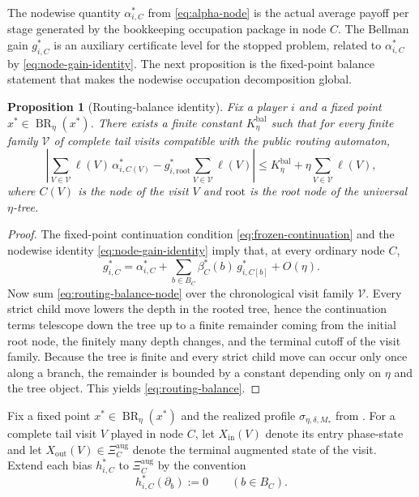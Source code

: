 \documentclass[12pt]{article}
\newtheorem{proposition}[theorem]{Proposition}
\theoremstyle{definition}
\newcommand{\1}{\mathbf{1}}
\DeclareMathOperator{\BR}{BR}
\begin{document}
The nodewise quantity $\alpha_{i,C}^*$ from \eqref{eq:alpha-node} is the actual
average payoff per stage generated by the bookkeeping occupation package in node
$C$. The Bellman gain $g_{i,C}^*$ is an auxiliary certificate level for the
stopped problem, related to $\alpha_{i,C}^*$ by
\eqref{eq:node-gain-identity}. The next proposition is the fixed-point balance
statement that makes the nodewise occupation decomposition global.

\begin{proposition}[Routing-balance identity]
\label{prop:routing-balance}
Fix a player $i$ and a fixed point $x^*\in\BR_\eta(x^*)$. There exists a finite
constant $K_\eta^{\mathrm{bal}}$ such that for every finite family
$\mathcal V$ of complete tail visits compatible with the public routing
automaton,
\begin{equation}
\label{eq:routing-balance}
\left|
\sum_{V\in\mathcal V}\ell(V)\,\alpha_{i,C(V)}^*
-
g_{i,\mathrm{root}}^*\sum_{V\in\mathcal V}\ell(V)
\right|
\le
K_\eta^{\mathrm{bal}} + \eta\sum_{V\in\mathcal V}\ell(V),
\end{equation}
where $C(V)$ is the node of the visit $V$ and $\mathrm{root}$ is the root node
of the universal $\eta$-tree.
\end{proposition}

\begin{proof}
The fixed-point continuation condition
\eqref{eq:frozen-continuation} and the nodewise identity
\eqref{eq:node-gain-identity} imply that, at every ordinary node $C$,
\begin{equation}
\label{eq:routing-balance-node}
g_{i,C}^*
=
\alpha_{i,C}^*
+
\sum_{b\in B_C}\beta_C^*(b)\,g_{i,C[b]}^*
+
O(\eta).
\end{equation}
Now sum \eqref{eq:routing-balance-node} over the chronological visit family
$\mathcal V$. Every strict child move lowers the depth in the rooted tree, hence
the continuation terms telescope down the tree up to a finite remainder coming
from the initial root node, the finitely many depth changes, and the terminal
cutoff of the visit family. Because the tree is finite and every strict child
move can occur only once along a branch, the remainder is bounded by a constant
depending only on $\eta$ and the tree object. This yields
\eqref{eq:routing-balance}.
\end{proof}

Fix a fixed point $x^*\in\BR_\eta(x^*)$ and the realized profile
$\sigma_{\eta,\delta,M_*}$ from . For a complete tail
visit $V$ played in node $C$, let $X_{\mathrm{in}}(V)$ denote its entry
phase-state and let $X_{\mathrm{out}}(V)\in\Xi_C^{\mathrm{aug}}$ denote the
terminal augmented state of the visit. Extend each bias $h_{i,C}^*$ to
$\Xi_C^{\mathrm{aug}}$ by the convention
\[
h_{i,C}^*(\partial_b):=0
\qquad (b\in B_C).
\]
\end{document}
